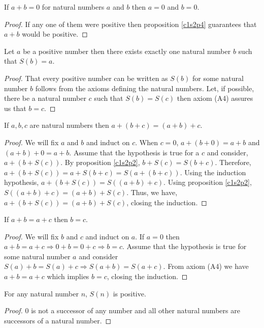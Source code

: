 \begin{cor}\label{c1s2c1}
If $a + b = 0$ for natural numbers $a$ and $b$ then $a = 0$ and $b = 0$.
\end{cor}
\begin{proof}
If any one of them were positive then proposition \ref{c1s2p4} guarantees 
that $a + b$ would be positive.
\end{proof}

\begin{prop}\label{c1s2p5}
Let $a$ be a positive number then there exists exactly one natural number 
$b$ such that $S(b) = a$.
\end{prop}
\begin{proof}
That every positive number can be written as $S(b)$ for some natural number
$b$ follows from the axioms defining the natural numbers. Let, if possible,
there be a natural number $c$ such that $S(b) = S(c)$ then axiom (A4)
assures us that $b = c$.
\end{proof}

\begin{prop}\label{c1s2p6}
If $a, b, c$ are natural numbers then $a + (b + c) = (a + b) + c$.
\end{prop}
\begin{proof}
We will fix $a$ and $b$ and induct on $c$. When $c = 0$, $a + (b + 0) = a
+ b$ and $(a + b) + 0 = a + b$. Assume that the hypothesis is true for a 
$c$ and consider, $a + (b + S(c))$. By proposition \ref{c1s2p2}, $b + S(c)
= S(b + c)$. Therefore, $a + (b + S(c)) = a + S(b + c) = S(a + (b + c))$. 
Using the induction hypothesis, $a + (b + S(c)) = S((a + b) + c)$. Using
proposition \ref{c1s2p2}, $S((a + b) + c) = (a + b) + S(c)$. Thus, we have,
$a + (b + S(c)) = (a + b) + S(c)$, closing the induction.
\end{proof}

\begin{prop}\label{c1s2p7}
If $a + b = a + c$ then $b = c$.
\end{prop}
\begin{proof}
We will fix $b$ and $c$ and induct on $a$. If $a = 0$ then $a + b = a + c
\Rightarrow 0 + b = 0 + c \Rightarrow b = c$. Assume that the hypothesis is
true for some natural number $a$ and consider $S(a) + b = S(a) + c 
\Rightarrow S(a + b) = S(a + c)$. From axiom (A4) we have $a + b = a + c$
which implies $b = c$, closing the induction.
\end{proof}

\begin{prop}\label{c1s2p8}
For any natural number $n$, $S(n)$ is positive.
\end{prop}
\begin{proof}
$0$ is not a successor of any number and all other natural numbers are
successors of a natural number.
\end{proof}

